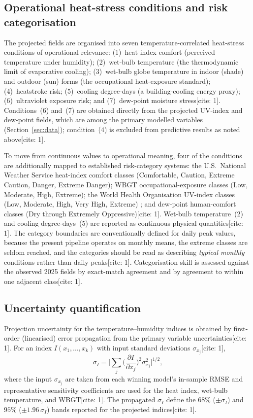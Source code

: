 \documentclass[pdflatex,sn-mathphys-ay]{sn-jnl}
\begin{document}
\subsection{Operational heat-stress conditions and risk categorisation}\label{sec:conditions}
The projected fields are organised into seven temperature-correlated heat-stress conditions of operational relevance: (1)~heat-index comfort (perceived temperature under humidity); (2)~wet-bulb temperature (the thermodynamic limit of evaporative cooling); (3)~wet-bulb globe temperature in indoor (shade) and outdoor (sun) forms (the occupational heat-exposure standard); (4)~heatstroke risk; (5)~cooling degree-days (a building-cooling energy proxy); (6)~ultraviolet exposure risk; and (7)~dew-point moisture stress[cite: 1]. Conditions~(6) and~(7) are obtained directly from the projected UV-index and dew-point fields, which are among the primary modelled variables (Section~\ref{sec:data}); condition~(4) is excluded from predictive results as noted above[cite: 1].

To move from continuous values to operational meaning, four of the conditions are additionally mapped to established risk-category systems: the U.S.\ National Weather Service heat-index comfort classes (Comfortable, Caution, Extreme Caution, Danger, Extreme Danger); WBGT occupational-exposure classes (Low, Moderate, High, Extreme); the World Health Organisation UV-index classes (Low, Moderate, High, Very High, Extreme) \citep{who2002}; and dew-point human-comfort classes (Dry through Extremely Oppressive)[cite: 1]. Wet-bulb temperature~(2) and cooling degree-days~(5) are reported as continuous physical quantities[cite: 1]. The category boundaries are conventionally defined for daily peak values, because the present pipeline operates on monthly means, the extreme classes are seldom reached, and the categories should be read as describing \emph{typical monthly} conditions rather than daily peaks[cite: 1]. Categorisation skill is assessed against the observed 2025 fields by exact-match agreement and by agreement to within one adjacent class[cite: 1].

\subsection{Uncertainty quantification}\label{sec:uncertainty}
Projection uncertainty for the temperature--humidity indices is obtained by first-order (linearised) error propagation from the primary variable uncertainties[cite: 1]. For an index $I(x_1,\dots,x_k)$ with input standard deviations $\sigma_{x_j}$[cite: 1],
\begin{equation}
\sigma_{I}=\Bigg[\sum_{j}\Big(\frac{\partial I}{\partial x_j}\Big)^{2} \sigma_{x_j}^{2}\Bigg]^{1/2},
\label{eq:errprop}
\end{equation}
where the input $\sigma_{x_j}$ are taken from each winning model's in-sample RMSE and representative sensitivity coefficients are used for the heat index, wet-bulb temperature, and WBGT[cite: 1]. The propagated $\sigma_{I}$ define the $68\%$ ($\pm\sigma_{I}$) and $95\%$ ($\pm1.96\,\sigma_{I}$) bands reported for the projected indices[cite: 1].
\end{document}
